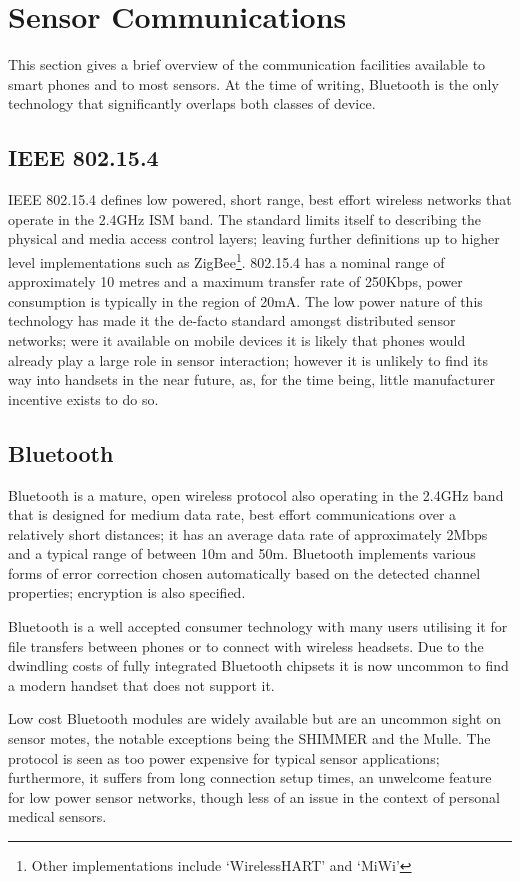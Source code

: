 \documentclass[conference,a4paper]{IEEEtran}
\begin{document}
\section{Sensor Communications\label{Communication.sec}}
This section gives a brief overview of the communication facilities available to smart phones and to most sensors. At the time of writing, Bluetooth is the only technology that significantly overlaps both classes of device.

\subsection{IEEE 802.15.4}
IEEE 802.15.4 defines low powered, short range, best effort wireless networks that operate in the 2.4GHz ISM band.
The standard limits itself to describing the physical and media access control layers; leaving further definitions up to higher level implementations such as ZigBee\footnote{Other implementations include `WirelessHART' and `MiWi'}.
802.15.4 has a nominal range of approximately 10 metres and a maximum transfer rate of 250Kbps, power consumption is typically in the region of 20mA.
The low power nature of this technology has made it the de-facto standard amongst distributed sensor networks; were it available on mobile devices it is likely that phones would already play a large role in sensor interaction; however it is unlikely to find its way into handsets in the near future, as, for the time being, little manufacturer incentive exists to do so.

\subsection{Bluetooth}
Bluetooth is a mature, open wireless protocol also operating in the 2.4GHz band that is designed for medium data rate, best effort communications over a relatively short distances; it has an average data rate of approximately 2Mbps and a typical range of between 10m and 50m.
Bluetooth implements various forms of error correction chosen automatically based on the detected channel properties; encryption is also specified.

Bluetooth is a well accepted consumer technology with many users utilising it for file transfers between phones or to connect with wireless headsets. Due to the dwindling costs of fully integrated Bluetooth chipsets it is now uncommon to find a modern handset that does not support it.

Low cost Bluetooth modules are widely available but are an uncommon sight on sensor motes, the notable exceptions being the SHIMMER and the Mulle.
The protocol is seen as too power expensive for typical sensor applications; furthermore, it suffers from long connection setup times, an unwelcome feature for low power sensor networks, though less of an issue in the context of personal medical sensors.
\end{document}
